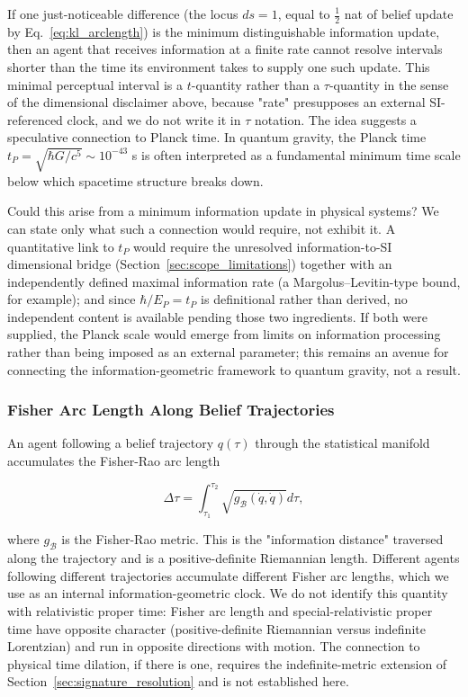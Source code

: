 \documentclass[11pt]{article}
\begin{document}
If one just-noticeable difference (the locus $ds = 1$, equal to $\tfrac{1}{2}$ nat of belief update by Eq.~\eqref{eq:kl_arclength}) is the minimum distinguishable information update, then an agent that receives information at a finite rate cannot resolve intervals shorter than the time its environment takes to supply one such update. This minimal perceptual interval is a $t$-quantity rather than a $\tau$-quantity in the sense of the dimensional disclaimer above, because "rate" presupposes an external SI-referenced clock, and we do not write it in $\tau$ notation. The idea suggests a speculative connection to Planck time. In quantum gravity, the Planck time $t_P = \sqrt{\hbar G/c^5} \sim 10^{-43}$ s is often interpreted as a fundamental minimum time scale below which spacetime structure breaks down.

Could this arise from a minimum information update in physical systems? We can state only what such a connection would require, not exhibit it. A quantitative link to $t_P$ would require the unresolved information-to-SI dimensional bridge (Section~\ref{sec:scope_limitations}) together with an independently defined maximal information rate (a Margolus--Levitin-type bound, for example); and since $\hbar/E_P = t_P$ is definitional rather than derived, no independent content is available pending those two ingredients. If both were supplied, the Planck scale would emerge from limits on information processing rather than being imposed as an external parameter; this remains an avenue for connecting the information-geometric framework to quantum gravity, not a result.

\subsubsection{Fisher Arc Length Along Belief Trajectories}
\label{sec:fisher_arc_length}

An agent following a belief trajectory $q(\tau)$ through the statistical manifold accumulates the Fisher-Rao arc length

\begin{equation}
\Delta \tau = \int_{\tau_1}^{\tau_2} \sqrt{g_{\mathcal{B}}(\dot{q}, \dot{q})}  d\tau,
\end{equation}

where $g_{\mathcal{B}}$ is the Fisher-Rao metric. This is the "information distance" traversed along the trajectory and is a positive-definite Riemannian length. Different agents following different trajectories accumulate different Fisher arc lengths, which we use as an internal information-geometric clock. We do not identify this quantity with relativistic proper time: Fisher arc length and special-relativistic proper time have opposite character (positive-definite Riemannian versus indefinite Lorentzian) and run in opposite directions with motion. The connection to physical time dilation, if there is one, requires the indefinite-metric extension of Section~\ref{sec:signature_resolution} and is not established here.
\end{document}
